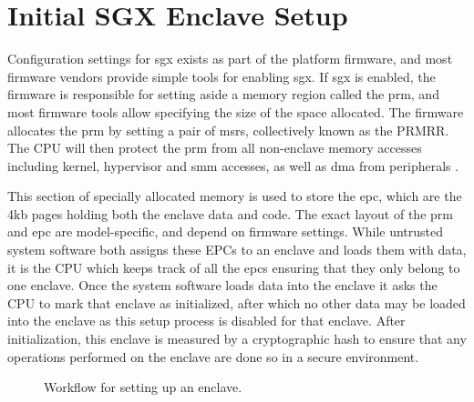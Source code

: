\section{Initial SGX Enclave Setup}
Configuration settings for \gls{sgx} exists as part of the platform firmware, and most firmware vendors provide simple tools for enabling \gls{sgx}. If \gls{sgx} is enabled, the firmware is responsible for setting aside a memory region called the \gls{prm}, and most firmware tools allow specifying the size of the space allocated. The firmware allocates the \gls{prm} by setting a pair of \glspl{msr}, collectively known as the PRMRR. The CPU will then protect the \gls{prm} from all non-enclave memory accesses including kernel, hypervisor and \gls{smm} accesses, as well as \gls{dma} from peripherals \cite{intel-sgx-explained}. 

This section of specially allocated memory is used to store the \gls{epc}, which are the 4kb pages holding both the enclave data and code. The exact layout of the \gls{prm} and \gls{epc} are model-specific, and depend on firmware settings. While untrusted system software both assigns these EPCs to an enclave and loads them with data, it is the CPU which keeps track of all the \gls{epc}s ensuring that they only belong to one enclave. Once the system software loads data into the enclave it asks the CPU to mark that enclave as initialized, after which no other data may be loaded into the enclave as this setup process is disabled for that enclave. After initialization, this enclave is measured by a cryptographic hash to ensure that any operations performed on the enclave are done so in a secure environment.
\vspace{10 mm}
\begin{figure}[h]
\centering
{}

\caption[Setting Up SGX]{Workflow for setting up an enclave.}
\label{fig:sgx_setup}
\end{figure}

